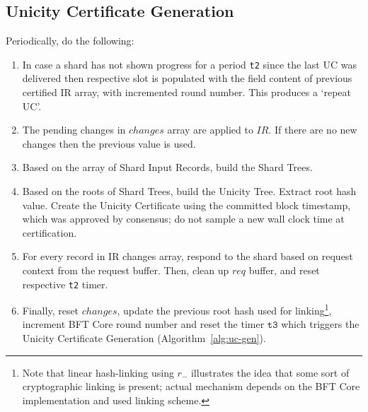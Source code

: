 \subsection{Unicity Certificate Generation}

Periodically, do the following:
\begin{enumerate}
  \item In case a shard has not shown progress for a period \texttt{t2} since the last UC was delivered then respective slot is  populated with the field content of previous certified IR array, with incremented round number. This produces a `repeat UC'.

  \item The pending changes in $changes$ array are applied to $IR$. If there are no new changes then the previous value is used.

  \item Based on the array of Shard Input Records, build the Shard Trees.

  \item Based on the roots of Shard Trees, build the Unicity Tree. Extract root hash value. Create the Unicity Certificate using the committed block timestamp, which was approved by consensus; do not sample a new wall clock time at certification.

  \item For every record in IR changes array, respond to the shard based on request context from the request buffer. Then, clean up $req$ buffer, and reset respective \texttt{t2} timer.

  \item Finally, reset $changes$, update the previous root hash used for linking\footnote{Note that linear hash-linking using $r_-$  illustrates the idea that some sort of cryptographic linking is present; actual mechanism depends on the BFT Core implementation and used linking scheme.}, increment BFT Core round number and reset the timer $\mathtt{t3}$ which triggers the Unicity Certificate Generation (Algorithm~\ref{alg:uc-gen}).
\end{enumerate}

